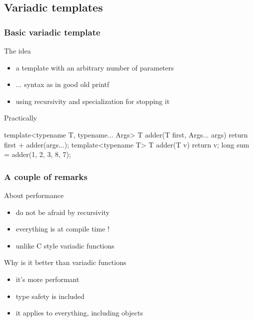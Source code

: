 \subsection[tmpl]{Variadic templates}


\begin{frame}[fragile]
  \frametitle{Basic variadic template}
  \begin{block}{The idea}
    \begin{itemize}
    \item a template with an arbitrary number of parameters
    \item ... syntax as in good old printf
    \item using recursivity and specialization for stopping it
    \end{itemize}
  \end{block}
  \begin{exampleblock}{Practically}
    \begin{cppcode*}{}
      template<typename T, typename... Args>
      T adder(T first, Args... args) {
        return first + adder(args...);
      }
      template<typename T>
      T adder(T v) {
        return v;
      }
      long sum = adder(1, 2, 3, 8, 7);
    \end{cppcode*}
  \end{exampleblock}
\end{frame}

\begin{frame}
  \frametitle{A couple of remarks}
  \begin{block}{About performance}
    \begin{itemize}
    \item do not be afraid by recursivity
    \item everything is at compile time !
    \item unlike C style variadic functions
    \end{itemize}
  \end{block}
  \begin{block}{Why is it better than variadic functions}
    \begin{itemize}
    \item it's more performant
    \item type safety is included
    \item it applies to everything, including objects
    \end{itemize}    
  \end{block}
\end{frame}
  
